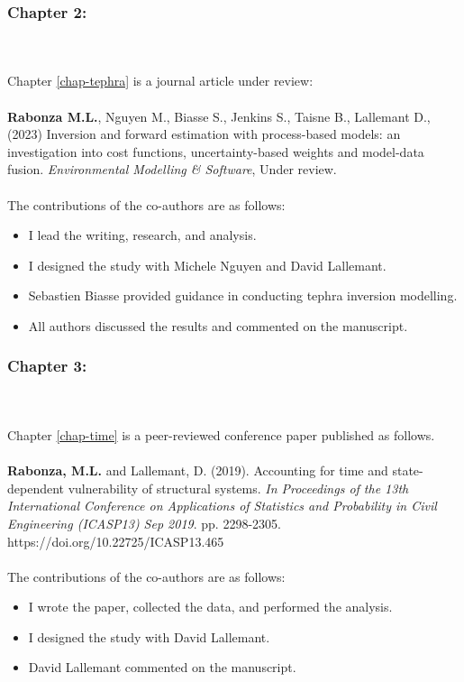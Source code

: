 {\subsubsection*{Chapter 2:}
\\ \\ \noindent
Chapter \ref{chap-tephra} is a journal article under review:
\\ \\ \noindent
    \textbf{Rabonza M.L.}, Nguyen M., Biasse S., Jenkins S., Taisne B., Lallemant D., (2023) Inversion and forward estimation with process-based models: an investigation into cost functions, uncertainty-based weights and model-data fusion. \textit{Environmental Modelling & Software}, Under review.
\\ \\ \noindent
    The contributions of the co-authors are as follows:
    \begin{itemize}
    \setlength\itemsep{-0.45em}
    \item I lead the writing, research, and analysis.
    \item I designed the study with Michele Nguyen and David Lallemant. 
    \item Sebastien Biasse provided guidance in conducting tephra inversion modelling.
    \item All authors discussed the results and commented on the manuscript.
    \end{itemize}

\vspace{.2cm}
\subsubsection*{Chapter 3:}
\\ \\ \noindent
Chapter \ref{chap-time} is a peer-reviewed conference paper published as follows.
\\ \\ \noindent
    \textbf{Rabonza, M.L.} and Lallemant, D. (2019). Accounting for time and state-dependent vulnerability of structural systems. \textit{In Proceedings of the 13th International Conference on Applications of Statistics and Probability in Civil Engineering (ICASP13) Sep 2019}. pp. 2298-2305. https://doi.org/10.22725/ICASP13.465
\\ \\ \noindent
    The contributions of the co-authors are as follows:
    \begin{itemize}
    \setlength\itemsep{-0.45em}
    \item I wrote the paper, collected the data, and performed the analysis.
    \item I designed the study with David Lallemant.
    \item David Lallemant commented on the manuscript.
    \end{itemize}

}
